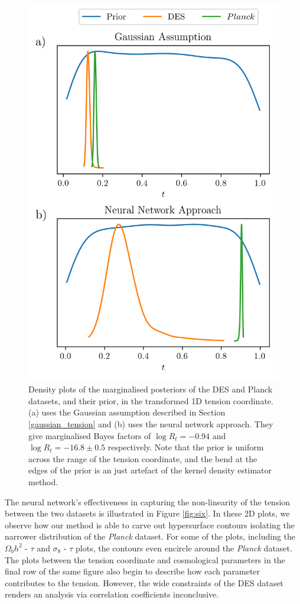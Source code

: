 \documentclass[%
 reprint,
 amsmath,amssymb,
 aps,
]{revtex4-2}
\begin{document}
\begin{figure}
    \includegraphics[width=0.8\columnwidth]{../plots/six_1d_compare.png}
    \centering
    \caption{Density plots of the marginalised posteriors of the DES and Planck datasets, and their prior, in the transformed 1D tension coordinate. (a) uses the Gaussian assumption described in Section \ref{gaussian_tension} and (b) uses the neural network approach. They give marginalised Bayes factors of $\log R_t = -0.94$ and $\log R_t = -16.8 \pm 0.5$ respectively. Note that the prior is uniform across the range of the tension coordinate, and the bend at the edges of the prior is an just artefact of the kernel density estimator method.}
    \label{fig:six_compare}
\end{figure}

The neural network's effectiveness in capturing the non-linearity of the tension between the two datasets is illustrated in Figure \ref{fig:six}. In these 2D plots, we observe how our method is able to carve out hypersurface contours isolating the narrower distribution of the \textit{Planck} dataset. For some of the plots, including the $\Omega_b h^2$ - $\tau$ and $\sigma_8$ - $\tau$ plots, the contours even encircle around the \textit{Planck} dataset. The plots between the tension coordinate and cosmological parameters in the final row of the same figure also begin to describe how each parameter contributes to the tension. However, the wide constraints of the DES dataset renders an analysis via correlation coefficients inconclusive. 
\end{document}
